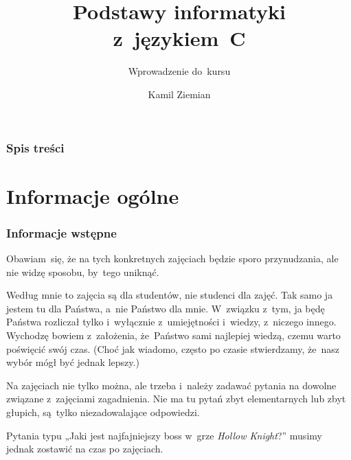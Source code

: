 \documentclass[10pt,t]{beamer}
\title{Podstawy informatyki z~językiem~C}
\subtitle{Wprowadzenie do~kursu}
\author{Kamil Ziemian}
\begin{document}





\RaggedRight





\maketitle





\begin{frame}
  \frametitle{Spis treści}


  \tableofcontents

\end{frame}





\section{Informacje ogólne}



\begin{frame}
  \frametitle{Informacje wstępne}


  Obawiam~się, że na tych konkretnych zajęciach będzie sporo przynudzania,
  ale nie widzę sposobu, by~tego uniknąć.

  Według mnie to zajęcia są dla studentów, nie studenci dla zajęć. Tak samo
  ja jestem tu dla Państwa, a~nie Państwo dla mnie. W~związku z~tym, ja
  będę Państwa rozliczał tylko i~wyłącznie z~umiejętności i~wiedzy,
  z~niczego innego. Wychodzę bowiem z~założenia, że~Państwo sami najlepiej
  wiedzą, czemu warto poświęcić swój czas. (Choć jak wiadomo, często po
  czasie stwierdzamy, że~nasz wybór mógł być jednak lepszy.)

  Na zajęciach nie tylko można, ale \alert{trzeba i~należy} zadawać pytania
  na dowolne związane z~zajęciami zagadnienia. Nie ma tu pytań zbyt
  elementarnych lub zbyt głupich, są~tylko niezadowalające odpowiedzi.

  Pytania typu „Jaki jest najfajniejszy boss w~grze \textit{Hollow
    Knight}?” musimy jednak zostawić na czas po zajęciach.

\end{frame}
\end{document}

